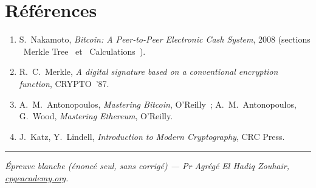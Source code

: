 \documentclass[11pt,a4paper]{article}
\begin{document}
\section*{Références}
\begin{enumerate}[nosep,leftmargin=1.5em]
  \item S.~Nakamoto, \emph{Bitcoin: A Peer-to-Peer Electronic Cash System}, 2008 (sections
        \guillemotleft~Merkle Tree~\guillemotright{} et \guillemotleft~Calculations~\guillemotright).
  \item R.~C.~Merkle, \emph{A digital signature based on a conventional encryption function},
        CRYPTO~'87.
  \item A.~M.~Antonopoulos, \emph{Mastering Bitcoin}, O'Reilly~; A.~M.~Antonopoulos, G.~Wood,
        \emph{Mastering Ethereum}, O'Reilly.
  \item J.~Katz, Y.~Lindell, \emph{Introduction to Modern Cryptography}, CRC Press.
\end{enumerate}

\vspace{0.4em}
\hrule\smallskip
{\footnotesize\itshape Épreuve blanche (énoncé seul, sans corrigé) --- Pr Agrégé El Hadiq Zouhair,
\href{https://cpgeacademy.org}{cpgeacademy.org}.}
\end{document}
